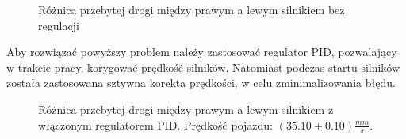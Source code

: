             \begin{figure}[!ht]
                \centering
                \renewcommand{\figurename}{Wykres}
                \caption{Różnica przebytej drogi między prawym a lewym silnikiem bez regulacji}
                \label{plot:distance_err_in_time_const_speed}
            \end{figure}

            Aby rozwiązać powyższy problem należy zastosować regulator PID, pozwalający w trakcie pracy, korygować prędkość silników.
            Natomiast podczas startu silników została zastosowana sztywna korekta prędkości, w celu zminimalizowania błędu.
            \begin{figure}[!ht]
                \centering
                \renewcommand{\figurename}{Wykres}
                \caption{Różnica przebytej drogi między prawym a lewym silnikiem z włączonym regulatorem PID. Prędkość pojazdu: $(35.10 \pm 0.10)\frac{mm}{s}$.}
                \label{plot:PID_distance_err_in_time}
            \end{figure}


